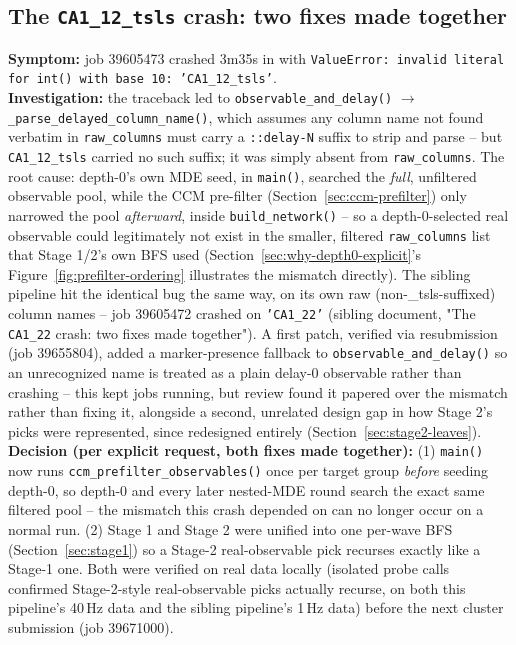 \documentclass[11pt]{article}
\begin{document}
\subsection{The \texttt{CA1\_12\_tsls} crash: two fixes made together}
\label{sec:history-prefilter-order}
\textbf{Symptom:} job 39605473 crashed 3m35s in with \texttt{ValueError: invalid literal for int() with base 10: 'CA1\_12\_tsls'}.\\
\textbf{Investigation:} the traceback led to \texttt{observable\_and\_delay()} $\to$ \texttt{\_parse\_delayed\_column\_name()}, which assumes any column name not found verbatim in \texttt{raw\_columns} must carry a \texttt{::delay-N} suffix to strip and parse -- but \texttt{CA1\_12\_tsls} carried no such suffix; it was simply absent from \texttt{raw\_columns}. The root cause: depth-0's own MDE seed, in \texttt{main()}, searched the \emph{full}, unfiltered observable pool, while the CCM pre-filter (Section~\ref{sec:ccm-prefilter}) only narrowed the pool \emph{afterward}, inside \texttt{build\_network()} -- so a depth-0-selected real observable could legitimately not exist in the smaller, filtered \texttt{raw\_columns} list that Stage 1/2's own BFS used (Section~\ref{sec:why-depth0-explicit}'s Figure~\ref{fig:prefilter-ordering} illustrates the mismatch directly). The sibling pipeline hit the identical bug the same way, on its own raw (non-\_tsls-suffixed) column names -- job 39605472 crashed on \texttt{'CA1\_22'} (sibling document, "The \texttt{CA1\_22} crash: two fixes made together"). A first patch, verified via resubmission (job 39655804), added a marker-presence fallback to \texttt{observable\_and\_delay()} so an unrecognized name is treated as a plain delay-0 observable rather than crashing -- this kept jobs running, but review found it papered over the mismatch rather than fixing it, alongside a second, unrelated design gap in how Stage 2's picks were represented, since redesigned entirely (Section~\ref{sec:stage2-leaves}).\\
\textbf{Decision (per explicit request, both fixes made together):} (1) \texttt{main()} now runs \texttt{ccm\_prefilter\_observables()} once per target group \emph{before} seeding depth-0, so depth-0 and every later nested-MDE round search the exact same filtered pool -- the mismatch this crash depended on can no longer occur on a normal run. (2) Stage 1 and Stage 2 were unified into one per-wave BFS (Section~\ref{sec:stage1}) so a Stage-2 real-observable pick recurses exactly like a Stage-1 one. Both were verified on real data locally (isolated probe calls confirmed Stage-2-style real-observable picks actually recurse, on both this pipeline's 40\,Hz data and the sibling pipeline's 1\,Hz data) before the next cluster submission (job 39671000).\\
\end{document}
